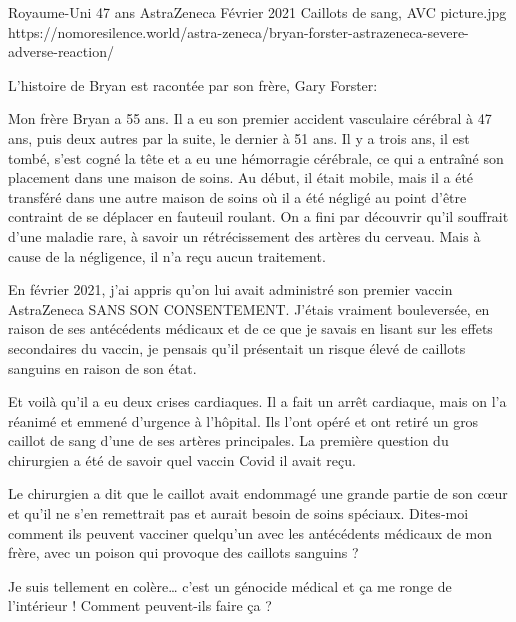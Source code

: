 {Royaume-Uni}
{47 ans}
{AstraZeneca}
{Février 2021}
{Caillots de sang, AVC}
{picture.jpg}
{https://nomoresilence.world/astra-zeneca/bryan-forster-astrazeneca-severe-adverse-reaction/}
{

L'histoire de Bryan est racontée par son frère, Gary Forster:

Mon frère Bryan a 55 ans. Il a eu son premier accident vasculaire cérébral à 47
ans, puis deux autres par la suite, le dernier à 51 ans. Il y a trois ans, il
est tombé, s'est cogné la tête et a eu une hémorragie cérébrale, ce qui a
entraîné son placement dans une maison de soins. Au début, il était mobile, mais
il a été transféré dans une autre maison de soins où il a été négligé au point
d'être contraint de se déplacer en fauteuil roulant. On a fini par découvrir
qu'il souffrait d'une maladie rare, à savoir un rétrécissement des artères du
cerveau. Mais à cause de la négligence, il n'a reçu aucun traitement.

En février 2021, j'ai appris qu'on lui avait administré son premier vaccin
AstraZeneca SANS SON CONSENTEMENT. J'étais vraiment bouleversée, en raison de
ses antécédents médicaux et de ce que je savais en lisant sur les effets
secondaires du vaccin, je pensais qu'il présentait un risque élevé de caillots
sanguins en raison de son état.

Et voilà qu'il a eu deux crises cardiaques. Il a fait un arrêt cardiaque, mais
on l'a réanimé et emmené d'urgence à l'hôpital. Ils l'ont opéré et ont retiré un
gros caillot de sang d'une de ses artères principales. La première question du
chirurgien a été de savoir quel vaccin Covid il avait reçu.

Le chirurgien a dit que le caillot avait endommagé une grande partie de son cœur
et qu'il ne s'en remettrait pas et aurait besoin de soins spéciaux. Dites-moi
comment ils peuvent vacciner quelqu'un avec les antécédents médicaux de mon
frère, avec un poison qui provoque des caillots sanguins ?

Je suis tellement en colère… c'est un génocide médical et ça me ronge de
l'intérieur ! Comment peuvent-ils faire ça ?

}
